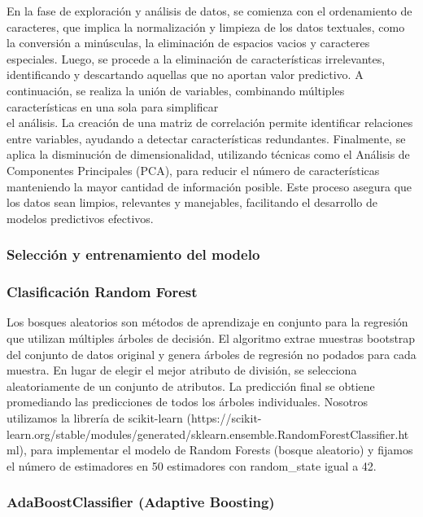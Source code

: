 \documentclass[
  number,
  preprint,
  3p,
  twocolumn]{elsarticle}
\begin{document}
En la fase de exploración y análisis de datos, se comienza con el
ordenamiento de caracteres, que implica la normalización y limpieza de
los datos textuales, como la conversión a minúsculas, la eliminación de
espacios vacios y caracteres especiales. Luego, se procede a la
eliminación de características irrelevantes, identificando y descartando
aquellas que no aportan valor predictivo. A continuación, se realiza la
unión de variables, combinando múltiples características en una sola
para simplificar\\
el análisis. La creación de una matriz de correlación permite
identificar relaciones entre variables, ayudando a detectar
características redundantes. Finalmente, se aplica la disminución de
dimensionalidad, utilizando técnicas como el Análisis de Componentes
Principales (PCA), para reducir el número de características manteniendo
la mayor cantidad de información posible. Este proceso asegura que los
datos sean limpios, relevantes y manejables, facilitando el desarrollo
de modelos predictivos efectivos.

\subsubsection{Selección y entrenamiento del
modelo}\label{selecciuxf3n-y-entrenamiento-del-modelo}

\subsubsection{Clasificación Random
Forest}\label{clasificaciuxf3n-random-forest}

Los bosques aleatorios son métodos de aprendizaje en conjunto para la
regresión que utilizan múltiples árboles de decisión. El algoritmo
extrae muestras bootstrap del conjunto de datos original y genera
árboles de regresión no podados para cada muestra. En lugar de elegir el
mejor atributo de división, se selecciona aleatoriamente de un conjunto
de atributos. La predicción final se obtiene promediando las
predicciones de todos los árboles individuales. Nosotros utilizamos la
librería de scikit-learn
(https://scikit-learn.org/stable/modules/generated/sklearn.ensemble.RandomForestClassifier.html),
para implementar el modelo de Random Forests (bosque aleatorio) y
fijamos el número de estimadores en 50 estimadores con random\_state
igual a 42.

\subsubsection{AdaBoostClassifier (Adaptive
Boosting)}\label{adaboostclassifier-adaptive-boosting}
\end{document}
